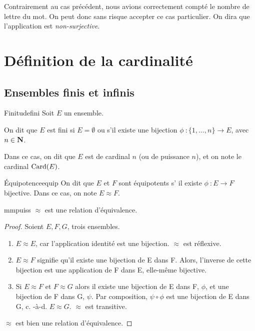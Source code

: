 \documentclass[a4paper,french,final]{memoir}
\begin{document}
Contrairement au cas précédent, nous avions correctement compté le nombre de lettre du mot. On peut donc sans risque accepter ce cas particulier. On dira que l'application est \emph{non-surjective}.
\chapter{Définition de la cardinalité}
\section{Ensembles finis et infinis}

\begin{defb}{Finitude}{fini}
     Soit $E$ un ensemble. 
	    
	On dit que $E$ est fini si $E = \emptyset$ ou s'il existe une bijection $\phi~: \{1,\dots,n \} \to E$, avec $n \in \mathbf{N}$. 
		
	Dans ce cas, on dit que $E$ est de cardinal $n$ (ou de puissance $n$), et on note le cardinal $\operatorname{Card}(E)$. 
\end{defb} 


\begin{defb}{\'Equipotence}{equip}
    On dit que $E$ et $F$ sont équipotents s' il existe $\phi~: E \to F$ bijective. Dans ce cas, on note $E \mathrel{\approx} F$. 
\end{defb}

\begin{theoremb}{}{mmpuiss}
    $ \mathrel{\approx}$ est une relation d'équivalence. 
\end{theoremb}
\begin{proof}
    Soient $E, F, G$, trois ensembles.
	\begin{enumerate} 
		\item $E \mathrel{\approx} E$, car l'application identité est une bijection. $\mathrel{\approx}$ est réflexive.
		\item $E \mathrel{\approx} F$ signifie qu'il existe une bijection de E dans F. Alors, l'inverse de cette bijection est une application de F dans E, elle-même bijective.
		\item Si $E \mathrel{\approx} F$ et $F \mathrel{\approx} G$ alors il existe une bijection de E dans F, $\phi$, et une bijection de F dans G, $\psi$. Par composition, $\psi\circ\phi$ est une bijection de E dans G, c. -à-d. $E \mathrel{\approx} G$. $\mathrel{\approx}$ est transitive. 
	\end{enumerate}
	$\mathrel{\approx}$ est bien une relation d'équivalence.
\end{proof}
\end{document}
